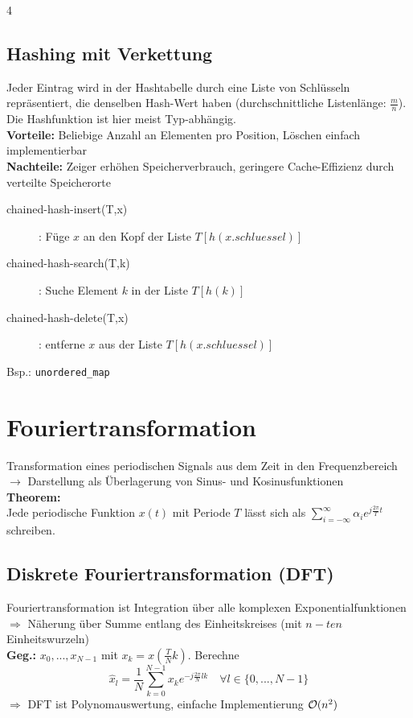 \documentclass[fs, footer]{latex4ei}
\renewcommand{\t}{\texttt}
\begin{document}
\begin{multicols*}{4}
{{\subsection{Hashing mit Verkettung}
Jeder Eintrag wird in der Hashtabelle durch eine Liste von Schlüsseln repräsentiert, die denselben Hash-Wert haben (durchschnittliche Listenlänge: $\frac{m}{n}$). Die Hashfunktion ist hier meist Typ-abhängig.\\
	\textbf{Vorteile:} Beliebige Anzahl an Elementen pro Position, Löschen einfach implementierbar \\
	\textbf{Nachteile:} Zeiger erhöhen Speicherverbrauch, geringere Cache-Effizienz durch verteilte Speicherorte
\begin{description}
	\item[chained-hash-insert(T,x)]: Füge $x$ an den Kopf der Liste $T[ h(x.schluessel)]$
	\item[chained-hash-search(T,k)]: Suche Element $k$ in der Liste $T[ h(k) ]$
	\item[chained-hash-delete(T,x)]: entferne $x$ aus der Liste $T[h(x.schluessel)]$
\end{description}
Bsp.: \t{unordered\_map}

\section{Fouriertransformation}
Transformation eines periodischen Signals aus dem Zeit in den Frequenzbereich $\rightarrow$ Darstellung als Überlagerung von Sinus- und Kosinusfunktionen\\
\textbf{Theorem:}\\
Jede periodische Funktion $x(t)$ mit Periode $T$ lässt sich als $\sum_{i=-\infty}^\infty \alpha_i e^{j\frac{2\pi}{T}t}$ schreiben.
\subsection{Diskrete Fouriertransformation (DFT)}
Fouriertransformation ist Integration über alle komplexen Exponentialfunktionen $\Rightarrow$ Näherung über Summe entlang des Einheitskreises (mit $n-ten$ Einheitswurzeln)\\
\textbf{Geg.:} $x_0, ..., x_{N-1}$ mit $x_k = x(\frac{T}{N}k)$.
Berechne \[\hat{x}_l = \dfrac{1}{N} \sum_{k=0}^{N-1}x_ke^{-j\frac{2\pi}{N}lk}\quad\forall l \in \{0,...,N-1\}\]
$\Rightarrow$ DFT ist Polynomauswertung, einfache Implementierung $\operatorname{\mathcal O}(n^2)$
}}
\end{multicols*}
\end{document}
